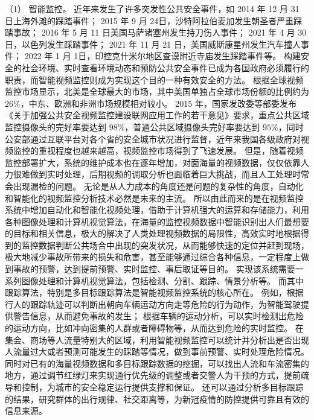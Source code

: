 （1）  智能监控。
近年来发生了许多突发性公共安全事件，如 2014 年 12 月 31 日上海外滩的踩踏事件；
2015 年 9 月 24日，沙特阿拉伯麦加发生朝圣者严重踩踏事故；
2016 年 5 月 11 日美国马萨诸塞州发生持刀伤人事件；
2021 年 4 月 30 日，以色列发生踩踏事件；
2021 年 11 月 21 日，美国威斯康星州发生汽车撞人事件；
2022 年 1 月 1日，印控克什米尔地区查谟附近寺庙发生踩踏事件等。
构建安全的社会环境、实时查看环境动态和预防公共安全事件已成为各国政府必须履行的职责，而智能视频监控则成为实现这个目的一种有效安全的方法。
根据全球视频监控市场显示，北美是全球最大的市场，其中美国单独占全球市场份额的比例约为 $ 26\%$，中东、欧洲和非洲市场规模相对较小。
2015 年，国家发改委等部委发布《关于加强公共安全视频监控建设联网应用工作的若干意见》要求，重点公共区域监控摄像头的完好率要达到 $ 98\% $，普通公共区域摄像头完好率要达到 $ 95\% $，同时公安部通过互联平台对各个省的安全城市状况进行监督，近年来我国各级政府对视频监控的重视程度也越来越高，视频监控市场得到了飞速发展。
但是，随着视频监控部署扩大，系统的维护成本也在逐年增加，对面海量的视频数据，仅仅依靠人力很难做到实时处理，后期视频的调取分析也面临着巨大挑战，而且人工处理时常会出现漏检的问题。
无论是从人力成本的角度还是问题的复杂性的角度，自动化和智能化的视频监控分析技术必然是未来的主流。
所以由此而来的是在视频监控系统中增加自动化和智能化视频处理，借助于计算机强大的运算和存储能力，利用各种图像处理和计算机视觉算法，在海量的监控视频数据中智能识别出人们最想要的目标和相关信息，极大的解决了人类处理视频数据的局限性，高效实时地根据得到的监控数据判断公共场合中出现的突发状况，从而能够快速的定位并赶到现场，极大地减少事故所带来的损失和危害，甚至能够通过综合各种信息，一定程度上做到事故的预警，达到提前预警、实时监控、事后取证等目的。
实现该系统需要一系列图像处理和计算机视觉算法，包括检测、分割、跟踪、情景分析等。
而其中跟踪算法，特别是多目标跟踪算法是智能视频监控系统的核心所在。
% 
例如，根据行人的跟踪轨迹可以判断出朝向车辆运动方向走等危险的行为动作，为智能驾驶提供警告信息，从而避免事故的发生；
根据车辆的运动分析，可以实时检测出危险的运动方向，比如冲向密集的人群或者障碍物等，从而达到危险的实时监控。
在集会、商场等人流量特别大的区域，利用智能视频监控可以统计并分析出是否出现人流量过大或者预测可能发生的踩踏等情况，做到事前预警、实时处理危险情况。
同时对已有的海量视频数据和多目标跟踪数据的挖掘，可以找出人流和车流密集的地方，通过调节红绿灯来实现通行优先级的调整或者交警人为干预的方式，提前疏导和控制，为城市的安全稳定运行提供支撑和保证。
还可以通过分析多目标跟踪的结果，研究群体的出行规律、社交距离等，为新冠疫情的防控提供可靠且有效的信息来源。

